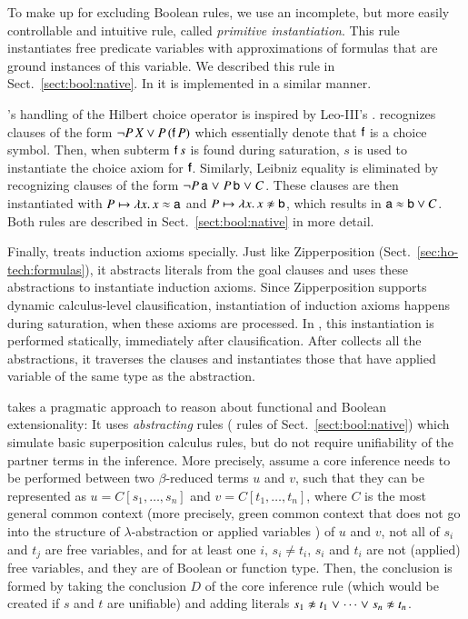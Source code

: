   To make up for excluding Boolean rules, we use an incomplete, but more
  easily controllable and intuitive rule, called \emph{primitive instantiation}. This
  rule instantiates free predicate variables with approximations of formulas
  that are ground instances of this variable. We described this rule in Sect.~\ref{sect:bool:native}.
  In \ehohii{} it is implemented in a similar manner.
  
  \ehohii{}'s handling of the Hilbert choice operator is inspired by Leo-III's
  \cite{sb-21-leo3}. \ehohii{}
  recognizes clauses of the form $\neg P \, X \lor P \, (\mathsf{f} \, P)$ which
  essentially denote that $\mathsf{f}$ is a choice symbol. Then, when subterm
  $\mathsf{f} \, s$ is found during saturation, $s$ is used to instantiate the choice
  axiom for $\mathsf{f}$. 
  Similarly, Leibniz equality is eliminated by
  recognizing clauses of the form  $\neg P \, \mathsf{a} \mathrel\lor P \, \mathsf{b} \mathrel\lor C$. These clauses are then
  instantiated with $P \mapsto \lambda x. \, x \approx \mathsf{a}$ and $P \mapsto \lambda
  x. \, x\noteq\cst{b}$, which results in $\mathsf{a} \approx \mathsf{b} \lor C$. Both rules
  are described in Sect.~\ref{sect:bool:native} in more detail.
  
  Finally, \ehohii{} treats induction axioms specially. Just like
  Zipperposition (Sect.~\ref{sec:ho-tech:formulas}), it abstracts literals
  from the goal clauses and uses these abstractions to instantiate induction
  axioms. Since Zipperposition supports dynamic calculus-level clausification,
  instantiation of induction axioms happens during saturation, when these axioms
  are processed. In \ehohii{}, this instantiation is performed statically,
  immediately after clausification. After \ehohii{} collects all the abstractions,
  it traverses the clauses and instantiates those that have applied variable of
  the same type as the abstraction.
  
   \ehohii{} takes a pragmatic approach to reason about
  functional and Boolean extensionality: It uses \emph{abstracting} rules ( rules of Sect.~\ref{sect:bool:native}) 
  which simulate basic superposition calculus rules,
  but do not require unifiability of the partner terms in the inference. More
  precisely, assume a core inference needs to be performed between two
  $\beta$-reduced terms $u$ and $v$, such that they can be represented as
  $u=C[s_1, \ldots, s_n]$ and $v=C[t_1, \ldots, t_n]$, where $C$ is the most general
  common context (more precisely, green common context that does not go into the structure of $\lambda$-abstraction or applied variables \cite{bbtvw-21-sup-lam}) of $u$ and $v$, not all of
  $s_i$ and $t_j$ are free variables, and for at least one $i$, $s_i \not= t_i$,
  $s_i$ and $t_i$ are not (applied) free variables, and they are of Boolean or
  function type. Then, the conclusion is formed by taking the conclusion $D$ of
  the core inference rule (which would be created if $s$ and $t$ are unifiable)
  and adding literals $s_1 \noteq t_1 \llor \cdots \llor s_n \noteq t_n$.
  
